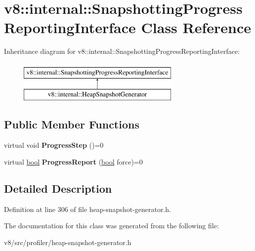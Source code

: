 \hypertarget{classv8_1_1internal_1_1SnapshottingProgressReportingInterface}{}\section{v8\+:\+:internal\+:\+:Snapshotting\+Progress\+Reporting\+Interface Class Reference}
\label{classv8_1_1internal_1_1SnapshottingProgressReportingInterface}
Inheritance diagram for v8\+:\+:internal\+:\+:Snapshotting\+Progress\+Reporting\+Interface\+:\begin{figure}[H]
\begin{center}
\leavevmode
\includegraphics[height=2.000000cm]{classv8_1_1internal_1_1SnapshottingProgressReportingInterface}
\end{center}
\end{figure}
\subsection*{Public Member Functions}
\begin{DoxyCompactItemize}
\item 
\mbox{\label{classv8_1_1internal_1_1SnapshottingProgressReportingInterface_abdd2a80e9a6dbbcfc3f8e510444c7acd}} 
virtual void {\bfseries Progress\+Step} ()=0
\item 
\mbox{\label{classv8_1_1internal_1_1SnapshottingProgressReportingInterface_a2b81b8715eac64dfee24b32cc3b1ed48}} 
virtual \mbox{\hyperlink{classbool}{bool}} {\bfseries Progress\+Report} (\mbox{\hyperlink{classbool}{bool}} force)=0
\end{DoxyCompactItemize}


\subsection{Detailed Description}


Definition at line 306 of file heap-\/snapshot-\/generator.\+h.



The documentation for this class was generated from the following file\+:\begin{DoxyCompactItemize}
\item 
v8/src/profiler/heap-\/snapshot-\/generator.\+h\end{DoxyCompactItemize}
